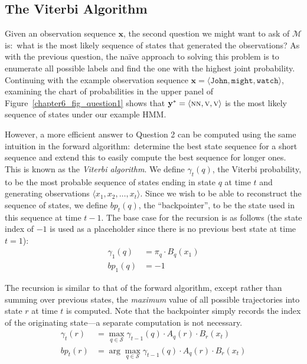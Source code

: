 \subsection{The Viterbi Algorithm}

Given an observation sequence $\mathbf{x}$, the second question we
might want to ask of $\mathcal{M}$ is:\ what is the most likely
sequence of states that generated the observations?  As with the
previous question, the na\"{i}ve approach to solving this problem is
to enumerate all possible labels and find the one with the highest
joint probability.  Continuing with the example observation sequence
$\textbf{x} = \langle \texttt{John} , \texttt{might} , \texttt{watch}
\rangle$, examining the chart of probabilities in the upper panel of
Figure~\ref{chapter6_fig_question1} shows that $\textbf{y}^* = \langle
\textsc{nn}, \textsc{v}, \textsc{v} \rangle$ is the most likely
sequence of states under our example HMM.

However, a more efficient answer to Question 2 can be computed using
the same intuition in the forward algorithm:\ determine the best state
sequence for a short sequence and extend this to easily compute the
best sequence for longer ones.  This is known as the \emph{Viterbi
  algorithm}.  We define $\gamma_t(q)$, the Viterbi probability, to be
the most probable sequence of states ending in state $q$ at time $t$
and generating observations $\langle x_1, x_2, \ldots , x_t \rangle$.
Since we wish to be able to reconstruct the sequence of states, we
define $bp_t(q)$, the ``backpointer'', to be the state used in this
sequence at time $t-1$.  The base case for the recursion is as follows
(the state index of $-1$ is used as a placeholder since there is no
previous best state at time $t=1$):
\begin{align}
\gamma_1(q) &= \pi_q \cdot B_q(x_1) \\
bp_1(q) & = -1
\end{align}

\noindent The recursion is similar to that of the forward algorithm,
except rather than summing over previous states, the \emph{maximum}
value of all possible trajectories into state $r$ at time $t$ is
computed.  Note that the backpointer simply records the index of the
originating state---a separate computation is not necessary.
\begin{align}
\gamma_t(r) & = \max_{q \in \mathcal{S}}  \gamma_{t-1}(q)  \cdot A_q(r) \cdot B_r(x_t)  \\
bp_t(r) & = \arg \max_{q \in \mathcal{S}} \gamma_{t-1}(q)  \cdot A_q(r) \cdot B_r(x_t)
\end{align}


